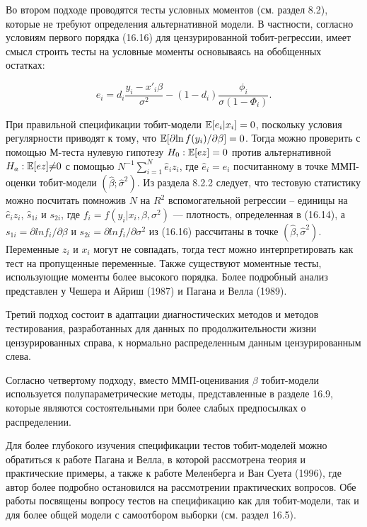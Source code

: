 Во втором подходе проводятся тесты условных моментов (см. раздел 8.2), которые не требуют определения альтернативной модели. В частности, согласно условиям первого порядка (16.16) для цензурированной тобит-регрессии, имеет смысл строить тесты на условные моменты основываясь на обобщенных остатках: 

\[
e_i=d_i\dfrac{y_i-x'_i\beta}{\sigma^2}-(1-d_i)\dfrac{\phi_i}{\sigma(1-\Phi_i)}.
\]

При правильной спецификации тобит-модели $\mathbb{E}[e_i|x_i]=0$, поскольку условия регулярности приводят к тому, что  $\mathbb{E}[\partial{\ln{ f(y_i)}}/\partial\beta]=0$. Тогда можно проверить с помощью М-теста нулевую гипотезу $H_0:\mathbb{E}[ez]=0$ против альтернативной $H_a:\mathbb{E}[ez]{\neq}0$ с помощью $N^{-1}\sum_{i=1}^N{\hat{e}_iz_i}$, где $\hat{e}_i=e_i$ посчитанному в точке  ММП-оценки тобит-модели  $(\hat{\beta};\hat{\sigma}^2)$. 
Из раздела 8.2.2 следует, что тестовую статистику можно посчитать помножив $N$ на $R^2$ вспомогательной регрессии -- единицы на $\hat{e}_iz_i$, $\hat{s}_{1i}$ и $s_{2i}$, где  $f_{i}=f(y_{i}|x_{i},\beta,\sigma^2)$ --- плотность, определенная в (16.14), а $s_{1i}=\partial{ln}f_{i}/\partial\beta$ и $s_{2i}=\partial{ln}f_{i}/\partial\sigma^2$ из (16.16) рассчитаны в точке $(\hat{\beta},\hat{\sigma}^2)$. Переменные $z_i$ и $x_i$ могут не совпадать, тогда тест можно интерпретировать как тест на пропущенные переменные. Также существуют моментные тесты, использующие моменты более высокого порядка. Более подробный анализ представлен у Чешера и Айриш (1987) и Пагана и Велла (1989). 

Третий подход состоит в адаптации диагностических методов и методов тестирования, разработанных для данных по продолжительности жизни цензурированных справа, к нормально распределенным данным цензурированным слева.


Согласно четвертому подходу, вместо ММП-оценивания $\beta$ тобит-модели используется полупараметрические методы, представленные в разделе 16.9, которые являются состоятельными при  более слабых предпосылках о распределении.

Для более глубокого изучения спецификации тестов тобит-моделей можно обратиться к работе Пагана и Велла, в которой рассмотрена теория и практические примеры, а также к работе Меленберга и Ван Суета (1996), где автор более подробно остановился на рассмотрении практических вопросов. Обе работы посвящены вопросу  тестов на спецификацию как для тобит-модели, так и для более общей модели с самоотбором выборки (см. раздел 16.5).



